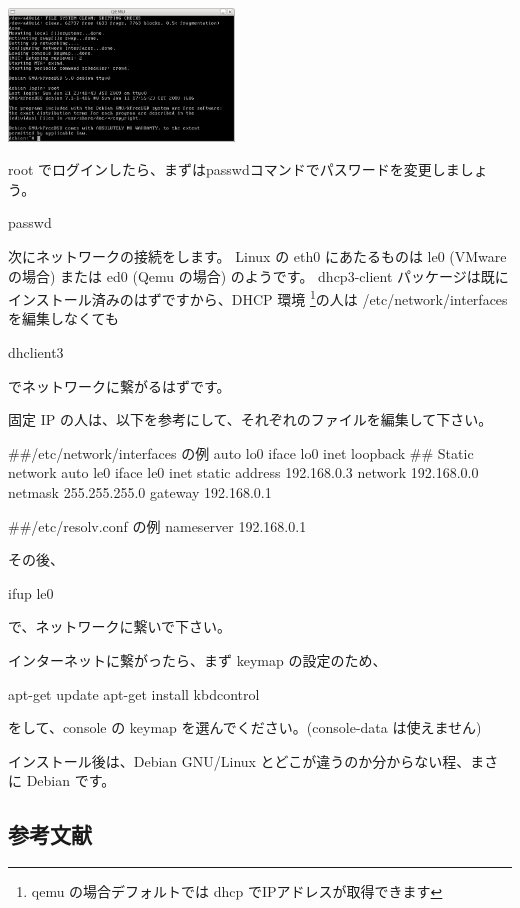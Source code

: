 \documentclass[mingoth,a4paper]{jsarticle}
\begin{document}
\includegraphics[width=6cm]{image200906/kfreebsdlogin.png}

root でログインしたら、まずはpasswdコマンドでパスワードを変更しましょう。
\begin{commandline}
passwd
\end{commandline}

次にネットワークの接続をします。
Linux の eth0 にあたるものは le0 (VMware の場合) または ed0 (Qemu の場合) 
のようです。
dhcp3-client パッケージは既にインストール済みのはずですから、DHCP 環境
\footnote{qemu の場合デフォルトでは dhcp でIPアドレスが取得できます}の人は /etc/network/interfaces を編集しなくても
\begin{commandline}
dhclient3
\end{commandline}
でネットワークに繋がるはずです。

固定 IP の人は、以下を参考にして、それぞれのファイルを編集して下さい。
\begin{commandline}
##/etc/network/interfaces の例
auto lo0
iface lo0 inet loopback
## Static network
auto le0
iface le0 inet static
    address 192.168.0.3
    network 192.168.0.0
    netmask 255.255.255.0
    gateway 192.168.0.1
\end{commandline}
\begin{commandline}
##/etc/resolv.conf の例
nameserver 192.168.0.1
\end{commandline}
その後、
\begin{commandline}
ifup le0
\end{commandline}
で、ネットワークに繋いで下さい。

インターネットに繋がったら、まず keymap の設定のため、
\begin{commandline}
apt-get update
apt-get install kbdcontrol
\end{commandline}
をして、console の keymap を選んでください。(console-data は使えません)

インストール後は、Debian GNU/Linux とどこが違うのか分からない程、まさに Debian です。

\subsection{参考文献}
\end{document}
